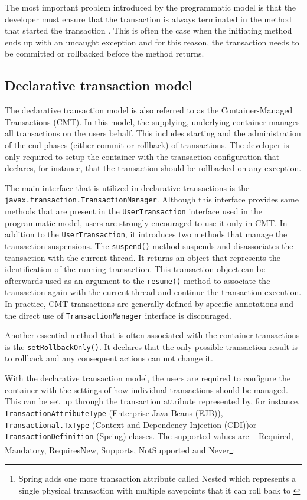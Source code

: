 \documentclass[oneside,
  digital, %
  table,   %
  nolof,     %
  nolot,     %
]{fithesis3}
\begin{document}
The most important problem introduced by the programmatic model is that the developer must ensure that the transaction is always terminated in the method that started the transaction \cite{java_transaction_design_strategies}. This is often the case when  the initiating method ends up with an uncaught exception and for this reason, the transaction needs to be committed or rollbacked before the method returns.

\subsection{Declarative transaction model}
\label{sec:decl-tran-model}

The declarative transaction model is also referred to as the Container-Managed Transactions (CMT). In this model, the supplying, underlying container manages all transactions on the users behalf. This includes starting and the administration of the end phases (either commit or rollback) of transactions. The developer is only required to setup the container with the transaction configuration that declares, for instance, that the transaction should be rollbacked on any exception.

The main interface that is utilized in declarative transactions is the \texttt{javax.transaction.TransactionManager}. Although this interface provides  same methods that are present in the \texttt{UserTransaction} interface used in the programmatic model, users are strongly encouraged to use it only in CMT. In addition to the \texttt{UserTransaction}, it introduces two methods that manage the transaction suspensions. The \texttt{suspend()} method suspends and  disassociates the transaction with the current thread. It returns an object that represents the identification of the running transaction. This transaction object can be afterwards used as an argument to the \texttt{resume()} method to associate the transaction again with the current thread and continue the transaction execution. In practice, CMT transactions are generally defined by specific annotations and the direct use of \texttt{TransactionManager} interface is discouraged.

Another essential method that is often associated with the container transactions is the \texttt{setRollbackOnly()}. It declares that the only possible transaction result is to rollback and any consequent actions can not change it.

With the declarative transaction model, the users are required to configure the container with the settings of how individual transactions should be managed. This can be set up through the transaction attribute represented by, for instance, \texttt{TransactionAttributeType} (Enterprise Java Beans (EJB)), \texttt{Transactional.TxType} (Context and Dependency Injection (CDI))or \texttt{TransactionDefinition} (Spring) classes. The supported values are -- Required, Mandatory, RequiresNew, Supports, NotSupported and Never\footnote{Spring adds one more transaction attribute called Nested which represents a single physical transaction with multiple savepoints that it can roll back to \cite{spring_transaction_management_documentation}}:
\end{document}
